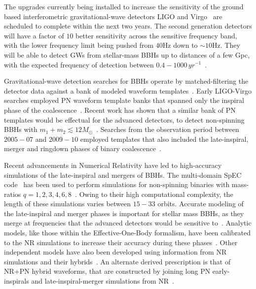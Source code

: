 
The upgrades currently being installed to increase the sensitivity of the
ground based interferometric gravitational-wave detectors LIGO and
Virgo~\cite{Harry:2010zz,aVIRGO} are scheduled to complete within the next
two years. The second generation detectors will have a factor of $10$ better 
sensitivity across the sensitive frequency band, with the lower frequency
limit being pushed from $40$Hz down to $\sim 10$Hz. 
They will be able to detect GWs from stellar-mass BBHs up to distances of a few
Gpc, with the expected frequency of detection between 
$0.4 - 1000\, yr^{-1}$~\cite{LSCCBCRates2010}.

Gravitational-wave detection searches for BBHs operate by matched-filtering
the detector data against a bank of modeled waveform 
templates~\cite{Babak:2012zx,Sathyaprakash:1991mt, SathyaMetric2PN,
OwenTemplateSpacing,BabaketalBankPlacement,SathyaBankPlacementTauN,
Cokelaer:2007kx}.
Early LIGO-Virgo searches employed PN waveform template banks
that spanned only the inspiral phase of the
coalescence~\cite{Colaboration:2011nz,Abadie:2010yb,Abbott:2009qj,
Abbott:2009tt,Messaritaki:2005wv}.
Recent work has shown that a similar bank of PN templates would be
effectual for the advanced detectors, to detect non-spinning BBHs with 
$m_1 + m_2 \lesssim 12M_\odot$~\cite{Brown:2012nn,CompTemplates2009}.
Searches from the observation period between $2005-07$ and $2009-10$ 
employed templates that also included the late-inspiral, merger and 
ringdown phases of binary coalescence~\cite{Abadie:2011kd,Aasi:2012rja}. 

Recent advancements in Numerical Relativity have led to high-accuracy 
simulations of the late-inspiral and mergers of BBHs. The multi-domain SpEC
code~\cite{spec} has been used to perform simulations for non-spinning 
binaries with mass-ratios
$q=1,2,3,4,6,8$~\cite{Buchman:2012dw,Mroue:2012kv,Mroue:2013inPrep}. 
Owing to their high computational complexity, the length of these
simulations varies between $15-33$ orbits. Accurate modeling of the
late-inspiral and merger phases is important for stellar mass BBHs,
as they merge at frequencies that the advanced detectors would be 
sensitive to~\cite{Brown:2012nn}. Analytic models, like those within the 
Effective-One-Body formalism, have been calibrated to the NR simulations 
to increase their accuracy during these 
phases~\cite{EOBOriginalBuonannoDamour,EOBNRdevel01,BuonannoEOBv2Main,
Taracchini:2012ig}. Other independent models have also been developed 
using information from NR simulations and their hybrids~\cite{NRAR:home,
Ajith:2007qp,Santamaria:2010yb,Huerta:2012zy}. An alternate derived 
prescription is that of NR+PN hybrid waveforms, that
are constructed by joining long PN early-inspirals and late-inspiral-merger
simulations from NR~\cite{Boyle:2011dy,MacDonald:2011ne,MacDonald:2012mp,
Ohme:2011zm,Hannam:2010ky}. 


